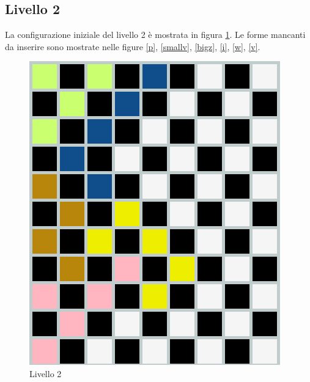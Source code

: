 \subsection{Livello 2}
La configurazione iniziale del livello 2 è mostrata in figura \ref{lev2}. Le forme mancanti da inserire sono mostrate nelle figure \ref{p}, \ref{smallv}, \ref{bigz}, \ref{i}, \ref{w}, \ref{v}.
\begin{figure}[h]
	\centering
	\includegraphics[scale=0.3]{immagini/lv2}
	\caption{Livello 2}
	\label{lev2}
\end{figure}

